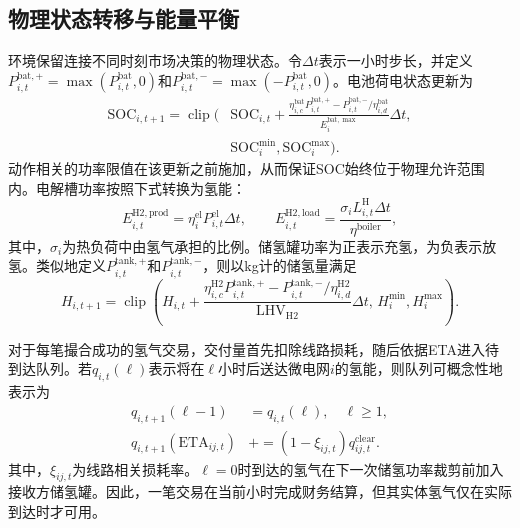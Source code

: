 \documentclass[final,5p,times]{elsarticle}
\begin{document}
\subsection{物理状态转移与能量平衡}
\label{sec:physical_transitions}

环境保留连接不同时刻市场决策的物理状态。令$\Delta t$表示一小时步长，并定义$P_{i,t}^{\mathrm{bat},+}=\max(P_{i,t}^{\mathrm{bat}},0)$和$P_{i,t}^{\mathrm{bat},-}=\max(-P_{i,t}^{\mathrm{bat}},0)$。电池荷电状态更新为
\begin{equation}
  \label{eq:soc_transition}
  \begin{aligned}
  \mathrm{SOC}_{i,t+1}=\operatorname{clip}\!\bigg(&\mathrm{SOC}_{i,t}+
  \frac{\eta_{i,c}^{\mathrm{bat}}P_{i,t}^{\mathrm{bat},+}-P_{i,t}^{\mathrm{bat},-}/\eta_{i,d}^{\mathrm{bat}}}{E_i^{\mathrm{bat},\max}}\Delta t,\\[-1mm]
  &\mathrm{SOC}_i^{\min},\mathrm{SOC}_i^{\max}\bigg).
  \end{aligned}
\end{equation}
动作相关的功率限值在该更新之前施加，从而保证SOC始终位于物理允许范围内。电解槽功率按照下式转换为氢能：
\begin{equation}
  \label{eq:electrolyzer_transition}
  E_{i,t}^{\mathrm{H2,prod}}=\eta_i^{\mathrm{el}}P_{i,t}^{\mathrm{el}}\Delta t,
  \qquad
  E_{i,t}^{\mathrm{H2,load}}=\frac{\sigma_i L_{i,t}^{\mathrm{H}}\Delta t}{\eta^{\mathrm{boiler}}},
\end{equation}
其中，$\sigma_i$为热负荷中由氢气承担的比例。储氢罐功率为正表示充氢，为负表示放氢。类似地定义$P_{i,t}^{\mathrm{tank},+}$和$P_{i,t}^{\mathrm{tank},-}$，则以kg计的储氢量满足
\begin{equation}
  \label{eq:h2_tank_transition}
  H_{i,t+1}=\operatorname{clip}\!\left(H_{i,t}+
  \frac{\eta_{i,c}^{\mathrm{H2}}P_{i,t}^{\mathrm{tank},+}-P_{i,t}^{\mathrm{tank},-}/\eta_{i,d}^{\mathrm{H2}}}{\mathrm{LHV}_{\mathrm{H2}}}\Delta t,\,
  H_i^{\min},H_i^{\max}\right).
\end{equation}

对于每笔撮合成功的氢气交易，交付量首先扣除线路损耗，随后依据ETA进入待到达队列。若$q_{i,t}(\ell)$表示将在$\ell$小时后送达微电网$i$的氢能，则队列可概念性地表示为
\begin{equation}
  \label{eq:pending_transition}
  \begin{aligned}
  q_{i,t+1}(\ell-1)&=q_{i,t}(\ell),\quad \ell\geq1,\\[-1mm]
  q_{i,t+1}(\mathrm{ETA}_{ij,t})&\mathrel{+}=(1-\xi_{ij,t})q_{ij,t}^{\mathrm{clear}}.
  \end{aligned}
\end{equation}
其中，$\xi_{ij,t}$为线路相关损耗率。$\ell=0$时到达的氢气在下一次储氢功率裁剪前加入接收方储氢罐。因此，一笔交易在当前小时完成财务结算，但其实体氢气仅在实际到达时才可用。
\end{document}
